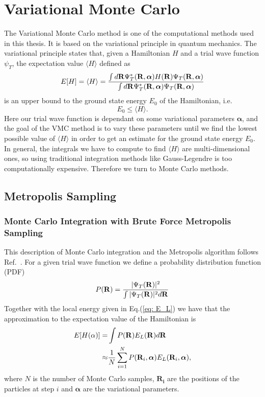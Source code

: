 \documentclass[../main.tex]{subfiles}
\begin{document}
\section{Variational Monte Carlo}

The Variational Monte Carlo method is one of the computational methods used in this thesis. It is based on the variational principle in quantum mechanics. The variational principle states that, given a Hamiltonian $H$ and a trial wave function $\psi_T$, the expectation value $\langle H \rangle$ defined as
\begin{equation}
 E[H] = \langle H \rangle =
 \frac{\int d {\bf R} \Psi_T^*({\bf R}, \boldsymbol{\alpha}) H({\bf R}) \Psi_T({\bf R}, \boldsymbol{\alpha})}
       {\int d {\bf R} \Psi_T^*({\bf R}, \boldsymbol{\alpha}) \Psi_T({\bf R}, \boldsymbol{\alpha})}
 \label{multidim}
\end{equation}
is an upper bound to the ground state energy $E_0$ of the Hamiltonian, i.e.
\begin{equation}
E_0 \leq \langle H \rangle.
\end{equation}
Here our trial wave function is dependant on some variational parameters $\boldsymbol{\alpha}$, and the goal of the VMC method is to vary these parameters until we find the lowest possible value of $\langle H\rangle$ in order to get an estimate for the ground state energy $E_0$. In general, the integrals we have to compute to find $\langle H\rangle$ are multi-dimensional ones, so using traditional integration methods like Gauss-Legendre is too computationally expensive. Therefore we turn to Monte Carlo methods.

\subsection{Metropolis Sampling}

\subsubsection{Monte Carlo Integration with Brute Force Metropolis Sampling}
This description of Monte Carlo integration and the Metropolis algorithm follows Ref.~\cite{FYS4411-Slides}.
For a given trial wave function we define a probability distribution function (PDF)
\begin{equation}
 P({\bf R}) = \frac{|\Psi_T({\bf R})|^2}{\int |\Psi_T({\bf R})|^2 d{\bf R}}
\end{equation}
Together with the local energy given in Eq.(\ref{eq: E_L}) we have that the approximation to the expectation value of the Hamiltonian is
\begin{align}
\begin{split}
E[H(\mathbf{\alpha})] =& \int P({\bf R}) E_L({\bf R}) d{\bf R}\\
\approx& \frac{1}{N} \sum_{i=1}^N P({\bf R}_i, \boldsymbol{\alpha}) E_L({\bf R}_i, \boldsymbol{\alpha}),
\end{split}
\end{align}
where $N$ is the number of Monte Carlo samples, $\mathbf{R_i}$ are the positions of the particles at step $i$ and $\boldsymbol{\alpha}$ are the variational parameters.
\end{document}
